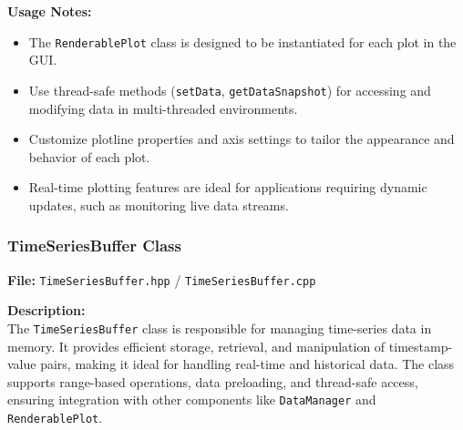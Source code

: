 \documentclass{article}
\begin{document}
\vspace{5pt}
\noindent
\textbf{Usage Notes:}
\begin{itemize}
    \item The \texttt{RenderablePlot} class is designed to be instantiated for each plot in the GUI.

    \item Use thread-safe methods (\texttt{setData}, \texttt{getDataSnapshot}) for accessing and modifying data in multi-threaded environments.

    \item Customize plotline properties and axis settings to tailor the appearance and behavior of each plot.

    \item Real-time plotting features are ideal for applications requiring dynamic updates, such as monitoring live data streams.
\end{itemize}


\vspace{10pt}
\subsubsection{TimeSeriesBuffer Class}
\textbf{File:} \texttt{TimeSeriesBuffer.hpp} / \texttt{TimeSeriesBuffer.cpp} 

\vspace{5pt}
\noindent
\textbf{Description:}
\\
\noindent
The \texttt{TimeSeriesBuffer} class is responsible for managing time-series data in memory. It provides efficient storage, retrieval, and manipulation of timestamp-value pairs, making it ideal for handling real-time and historical data. The class supports range-based operations, data preloading, and thread-safe access, ensuring integration with other components like \texttt{DataManager} and \texttt{RenderablePlot}.
\end{document}
